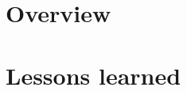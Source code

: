 \documentclass[12pt,twoside,a4paper]{report}
\theoremstyle{definition}
\theoremstyle{definition}
\theoremstyle{definition}
\theoremstyle{definition}
\begin{document}
    \section{Overview}

    \section{Lessons learned}



\printbibliography

\appendix

\cleardoublepage
\let\cleardoublepage\clearpage
\pagestyle{empty}

\AtBeginShipoutNext{\AtBeginShipoutDiscard}
\end{document}
